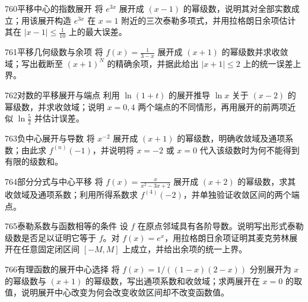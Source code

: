 \begin{exercise}{760}{平移中心的指数展开}
将 $e^{3x}$ 展开成 $(x-1)$ 的幂级数，说明其对全部实数成立；用该展开构造 $e^{3x}$ 在 $x=1$ 附近的三次泰勒多项式，并用拉格朗日余项估计其在 $|x-1|\le\frac1{10}$ 上的最大误差。
\end{exercise}
\begin{exercise}{761}{平移几何级数与余项}
将 $f(x)=\frac1{3-x}$ 展开成 $(x+1)$ 的幂级数并求收敛域；写出截断至 $(x+1)^N$ 的精确余项，并据此给出 $|x+1|\le2$ 上的统一误差上界。
\end{exercise}
\begin{exercise}{762}{对数的平移展开与端点}
利用 $\ln(1+t)$ 的展开推导 $\ln x$ 关于 $(x-2)$ 的幂级数，并求收敛域；说明 $x=0,4$ 两个端点的不同情形，再用展开的前两项近似 $\ln\frac52$ 并估计误差。
\end{exercise}
\begin{exercise}{763}{负中心展开与导数}
将 $x^{-2}$ 展开成 $(x+1)$ 的幂级数，明确收敛域及通项系数；由此求 $f^{(n)}(-1)$，并说明将 $x=-2$ 或 $x=0$ 代入该级数时为何不能得到有限的级数和。
\end{exercise}
\begin{exercise}{764}{部分分式与中心平移}
将 $f(x)=\frac{x}{x^2-3x+2}$ 展开成 $(x+2)$ 的幂级数，求其收敛域及通项系数；利用所得系数求 $f^{(4)}(-2)$，并单独验证收敛区间的两个端点。
\end{exercise}
\begin{exercise}{765}{泰勒系数与函数相等的条件}
设 $f$ 在原点邻域具有各阶导数。说明写出形式泰勒级数是否足以证明它等于 $f$。对 $f(x)=e^x$，用拉格朗日余项证明其麦克劳林展开在任意固定闭区间 $[-M,M]$ 上成立，并给出余项的统一上界。
\end{exercise}
\begin{exercise}{766}{有理函数的展开中心选择}
将 $f(x)=1/((1-x)(2-x))$ 分别展开为 $x$ 的幂级数与 $(x+1)$ 的幂级数，写出通项系数和收敛域；求两展开在 $x=0$ 的取值，说明展开中心改变为何会改变收敛区间却不改变函数值。
\end{exercise}
